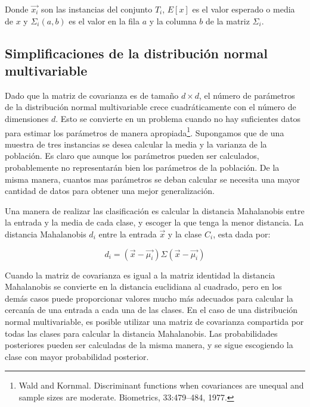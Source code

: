 \documentclass[a4paper, 11pt, oneside]{report}
\begin{document}
Donde $\vec{x_i}$ son las instancias del conjunto $T_i$, $E[x]$ es el valor esperado o media de $x$ y $\Sigma_i(a,b)$ es el valor en la fila $a$ y la columna $b$ de la matriz $\Sigma_i$.

\subsection{Simplificaciones de la distribución normal multivariable}

Dado que la matriz de covarianza es de tamaño $d \times d$, el número de parámetros de la distribución normal multivariable crece cuadráticamente con el número de dimensiones $d$. Esto se convierte en un problema cuando no hay suficientes datos para estimar los parámetros de manera apropiada\footnote{Wald and Kornmal. Discriminant functions when covariances are unequal and sample sizes are moderate. Biometrics, 33:479–484, 1977.}. Supongamos que de una muestra de tres instancias se desea calcular la media y la varianza de la población. Es claro que aunque los parámetros pueden ser calculados, probablemente no representarán bien los parámetros de la población. De la misma manera, cuantos mas parámetros se deban calcular se necesita una mayor cantidad de datos para obtener una mejor generalización.

Una manera de realizar las clasificación es calcular la distancia Mahalanobis entre la entrada y la media de cada clase, y escoger la que tenga la menor distancia. La distancia Mahalanobis $d_i$ entre la entrada $\vec{x}$ y la clase $C_i$, esta dada por:

	\begin{equation}
		\label{eq:mahalanobis}
		d_i = (\vec{x}-\vec{\mu_i})\Sigma(\vec{x}-\vec{\mu_i}) 
	\end{equation}

Cuando la matriz de covarianza es igual a la matriz identidad la distancia Mahalanobis se convierte en la distancia euclidiana al cuadrado, pero en los demás casos puede proporcionar valores mucho más adecuados para calcular la cercanía de una entrada a cada una de las clases. En el caso de una distribución normal multivariable, es posible utilizar una matriz de covarianza compartida por todas las clases para calcular la distancia Mahalanobis. Las probabilidades posteriores pueden ser calculadas de la misma manera, y se sigue escogiendo la clase con mayor probabilidad posterior.

\end{document}
